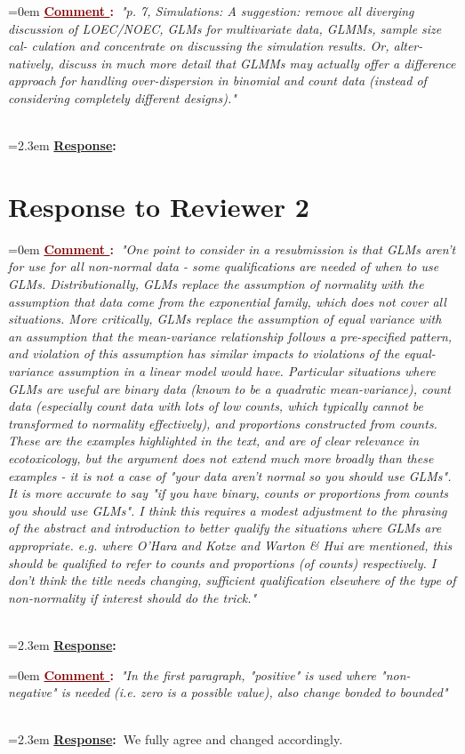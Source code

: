 \documentclass[12pt]{article}
\newcounter{cN}
\newcommand{\comment}[1]{
	\vspace{2em} 
	\refstepcounter{cN} %
	\noindent \hangindent=0em \textbf{\textcolor{Maroon}{\uline{Comment \thecN}:~}}\emph{"#1"}
	}
\newcommand{\response}[1]{
	\\[0.25em] 
	\hangindent=2.3em \textbf{\textcolor{NavyBlue}{\uline{Response}:~}}#1 
	}
\begin{document}
\comment{p. 7, Simulations: A suggestion: remove all diverging discussion of
LOEC/NOEC, GLMs for multivariate data, GLMMs, sample size cal-
culation and concentrate on discussing the simulation results. Or, alter-
natively, discuss in much more detail that GLMMs may actually offer a
difference approach for handling over-dispersion in binomial and count
data (instead of considering completely different designs).}
\response{}




\section{Response to Reviewer 2}
\vspace{-2em}

\comment{One point to consider in a resubmission is that GLMs aren't for use for all non-normal data - some qualifications are needed of when to use GLMs.  Distributionally, GLMs replace the assumption of normality with the assumption that data come from the exponential family, which does not cover all situations.  More critically, GLMs replace the assumption of equal variance with an assumption that the mean-variance relationship follows a pre-specified pattern, and violation of this assumption has similar impacts to violations of the equal-variance assumption in a linear model would have.  Particular situations where GLMs are useful are binary data (known to be a quadratic mean-variance), count data (especially count data with lots of low counts, which typically cannot be transformed to normality effectively), and proportions constructed from counts.  These are the examples highlighted in the text, and are of clear relevance in ecotoxicology, but the argument does not extend much
more broadly than these examples - it is not a case of "your data aren't normal so you should use GLMs".  It is more accurate to say "if you have binary, counts or proportions from counts you should use GLMs".  I think this requires a modest adjustment to the phrasing of the abstract and introduction to better qualify the situations where GLMs are appropriate.  e.g. where O'Hara and Kotze and Warton \& Hui are mentioned, this should be qualified to refer to counts and proportions (of counts) respectively.  I  don't think the title needs changing, sufficient qualification elsewhere of the type of non-normality if interest should do the trick.}
\response{}

\comment{In the first paragraph, "positive" is used where "non-negative" is needed (i.e. zero is a possible value), also change bonded to bounded}
\response{We fully agree and changed accordingly.}
\end{document}

